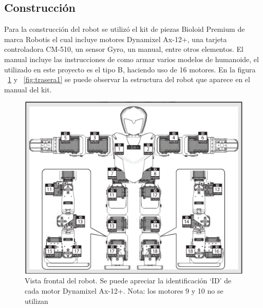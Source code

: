 \subsection{Construcción}
Para la construcción del robot se utilizó el kit de piezas Bioloid Premium de marca Robotis el cual incluye motores Dynamixel Ax-12+, una tarjeta controladora CM-510, un sensor Gyro, un manual, entre otros elementos. El manual incluye las instrucciones de como armar varios modelos de humanoide, el utilizado en este proyecto es el tipo B, haciendo uso de 16 motores. En la figura ~\ref{fig:frontal} y ~\ref{fig:trasera1} se puede observar la estructura del robot que aparece en el manual del kit. 

\begin{figure}[hbtp]
\centering
\includegraphics[scale=0.3]{imagenes/Robot.png}
\caption{Vista frontal del robot. Se puede apreciar la identificación ‘ID’ de cada motor Dynamixel Ax-12+. Nota: los motores 9 y 10 no se utilizan}
\label{fig:frontal}
\end{figure}

